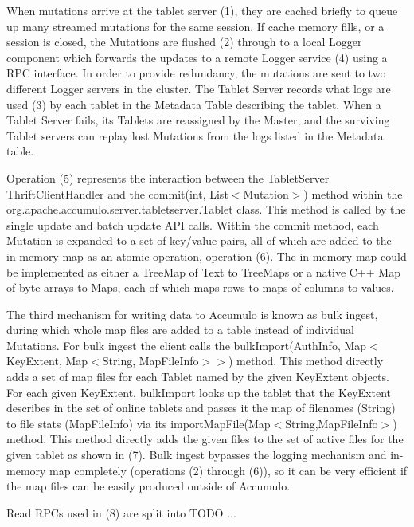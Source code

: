 \documentclass[letterpaper,onecolumn,12pt,titlepage]{article}
\begin{document}

When mutations arrive at the tablet server (1), they are cached briefly to queue up many streamed mutations for the same session.
If cache memory fills, or a session is closed, the Mutations are flushed (2) through to a local Logger component which 
forwards the updates to a remote Logger service (4) using a RPC interface.  
In order to provide redundancy, the mutations are sent to two different Logger servers in the cluster.
The Tablet Server records what logs are used (3) by each tablet in the Metadata Table describing the tablet.
When a Tablet Server fails, its Tablets are reassigned by the Master, 
and the surviving Tablet servers can replay lost Mutations from the logs listed in the Metadata table.


Operation (5) represents the interaction between the TabletServer ThriftClientHandler and the commit(int, List$<$Mutation$>$) method within the org.apache.accumulo.server.tabletserver.Tablet class.
This method is called by the single update and batch update API calls.
Within the commit method, each Mutation is expanded to a set of key/value pairs, all of which are added to the in-memory map as an atomic operation, operation (6).
The in-memory map could be implemented as either a TreeMap of Text to TreeMaps or a native C++ Map of byte arrays to Maps, each of which maps rows to maps of columns to values.

The third mechanism for writing data to Accumulo is known as bulk ingest, during which whole map files are added to a table instead of individual Mutations.
For bulk ingest the client calls the bulkImport(AuthInfo, Map$<$KeyExtent, Map$<$String, MapFileInfo$>$$>$) method.
This method directly adds a set of map files for each Tablet named by the given KeyExtent objects.
For each given KeyExtent, bulkImport looks up the tablet that the KeyExtent describes in the set of online tablets and passes it the map of filenames (String) to file stats (MapFileInfo) via its importMapFile(Map$<$String,MapFileInfo$>$) method.
This method directly adds the given files to the set of active files for the given tablet as shown in (7).
Bulk ingest bypasses the logging mechanism and in-memory map completely (operations (2) through (6)), so it can be very efficient if the map files can be easily produced outside of Accumulo.

Read RPCs used in (8) are split into TODO ...
\end{document}
